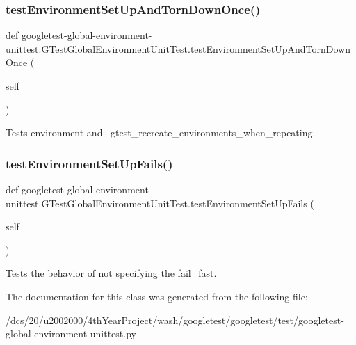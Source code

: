 \subsubsection{\texorpdfstring{test\+Environment\+Set\+Up\+And\+Torn\+Down\+Once()}{testEnvironmentSetUpAndTornDownOnce()}}
{\footnotesize\ttfamily def googletest-\/global-\/environment-\/unittest.\+G\+Test\+Global\+Environment\+Unit\+Test.\+test\+Environment\+Set\+Up\+And\+Torn\+Down\+Once (\begin{DoxyParamCaption}\item[{}]{self }\end{DoxyParamCaption})}

\begin{DoxyVerb}Tests environment and --gtest_recreate_environments_when_repeating.\end{DoxyVerb}
 \mbox{\label{classgoogletest-global-environment-unittest_1_1GTestGlobalEnvironmentUnitTest_a89551752cbf7bfdd43d7c397e18d1bbb}} 
\subsubsection{\texorpdfstring{test\+Environment\+Set\+Up\+Fails()}{testEnvironmentSetUpFails()}}
{\footnotesize\ttfamily def googletest-\/global-\/environment-\/unittest.\+G\+Test\+Global\+Environment\+Unit\+Test.\+test\+Environment\+Set\+Up\+Fails (\begin{DoxyParamCaption}\item[{}]{self }\end{DoxyParamCaption})}

\begin{DoxyVerb}Tests the behavior of not specifying the fail_fast.\end{DoxyVerb}
 

The documentation for this class was generated from the following file\+:\begin{DoxyCompactItemize}
\item 
/dcs/20/u2002000/4th\+Year\+Project/wash/googletest/googletest/test/googletest-\/global-\/environment-\/unittest.\+py\end{DoxyCompactItemize}
